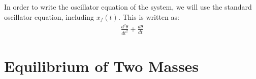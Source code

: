 \documentclass{article}
\begin{document}
\subsection{} %

In order to write the oscillator equation of the system, we will use the standard oscillator equation, including $x_f(t)$. This is written as:
\begin{align*}
	\frac{d^2\theta}{dt^2} + \frac{d\theta}{dt}
\end{align*}

\subsection{} %



\subsection{} %



\subsection{} %

\section{Equilibrium of Two Masses}

\subsection{} %



\subsection{} %



\subsection{} %



\subsection{} %
\end{document}
